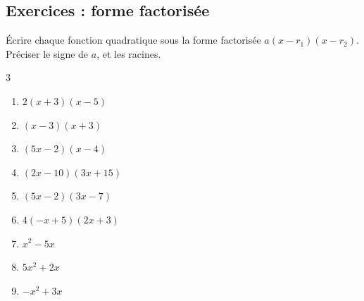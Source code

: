 \documentclass[main.tex]{subfiles}
\begin{document}
\subsection*{Exercices : forme factorisée}
\begin{exercise}\label{chapitre01:exercice:factorise:01} Écrire chaque fonction quadratique sous la forme factorisée $a(x-r_1)(x-r_2)$.\\
Préciser le signe de $a$, et les racines.\vspace{-1em}

\begin{multicols}{3} 
\begin{enumerate}[label={$f_\arabic*(x)=$\rule{0pt}{1.8em}}, leftmargin=*] 
	\item $2(x+3)(x-5)$
	\item $(x-3)(x+3)$ 
	\item $(5x-2)(x-4)$ 
	\item $(2x-10)(3x+15)$
	\item $(5x-2)(3x-7)$
	\item $4(-x+5)(2x+3)$ 
	\item $x^2-5x$
	\item $5x^2+2x$
	\item $-x^2+3x$
\end{enumerate}
\end{multicols} 
\end{exercise}
\end{document}
